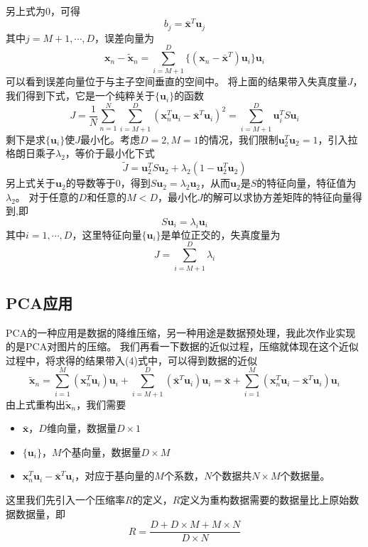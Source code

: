 \documentclass[UTF8,12pt]{ctexart}
\begin{document}
另上式为0，可得
\begin{equation}
	b_j=\bar{\bm{x}}^T\bm{u}_j
\end{equation}
其中$j=M+1,\cdots,D$，误差向量为
\begin{equation}
	\bm{x}_n-\tilde{\bm{x}}_n = \sum_{i=M+1}^D\{(\bm{x}_n-\bar{\bm{x}}^T)\bm{u}_i\}\bm{u}_i
\end{equation}
可以看到误差向量位于与主子空间垂直的空间中。
将上面的结果带入失真度量$J$，我们得到下式，它是一个纯粹关于$\{\bm{u}_i\}$的函数
\begin{equation}
	J=\frac{1}{N}\sum_{n=1}^N\sum_{i=M+1}^D(\bm{x}_n^T\bm{u}_i-\bar{\bm{x}}^T\bm{u}_i)^2
	=\sum_{i=M+1}^D\bm{u}_i^TS\bm{u}_i
\end{equation}
剩下是求$\{\bm{u}_i\}$使$J$最小化。考虑$D=2,M=1$的情况，我们限制$\bm{u}_2^T\bm{u}_2=1$，引入拉格朗日乘子$\lambda_2$，等价于最小化下式
\begin{equation}
	\tilde{J}=\bm{u}_2^TS\bm{u}_2+\lambda_2(1-\bm{u}_2^T\bm{u}_2)
\end{equation}
另上式关于$\bm{u}_2$的导数等于0，得到$S\bm{u}_2=\lambda_2\bm{u}_2$，从而$\bm{u}_2$是$S$的特征向量，特征值为$\lambda_2$。
对于任意的$D$和任意的$M<D$，最小化$J$的解可以求协方差矩阵的特征向量得到,即
\begin{equation}
	S\bm{u}_i=\lambda_i\bm{u}_i
\end{equation}
其中$i=1,\cdots,D$，这里特征向量$\{\bm{u}_i\}$是单位正交的，失真度量为
\begin{equation}
	J = \sum_{i=M+1}^D\lambda_i
\end{equation}
\subsection*{PCA应用}
PCA的一种应用是数据的降维压缩，另一种用途是数据预处理，我此次作业实现的是PCA对图片的压缩。
我们再看一下数据的近似过程，压缩就体现在这个近似过程中，将求得的结果带入(4)式中，可以得到数据的近似
\begin{equation}
\tilde{\bm{x}}_n = \sum_{i=1}^M(\bm{x}_n^T \bm{u}_i)\bm{u}_i+\sum_{i=M+1}^D(\bar{\bm{x}}^T\bm{u}_i)\bm{u}_i
	=\bar{\bm{x}}+\sum_{i=1}^M(\bm{x}_n^T\bm{u}_i-\bar{\bm{x}}^T\bm{u}_i)\bm{u}_i
\end{equation}
由上式重构出$\tilde{\bm{x}}_n$，我们需要
\begin{itemize}
	\item $\bar{\bm{x}}$，$D$维向量，数据量$D\times 1$
	\item $\{\bm{u}_i\}$，$M$个基向量，数据量$D \times M$
	\item $\bm{x}_n^T\bm{u}_i-\bar{\bm{x}}^T\bm{u}_i$，对应于基向量的$M$个系数，$N$个数据共$N \times M$个数据量。
\end{itemize}
这里我们先引入一个压缩率$R$的定义，$R$定义为重构数据需要的数据量比上原始数据数据量，即
\begin{equation}
	R=\frac{D+D\times M+M\times N}{D\times N}
\end{equation}
\end{document}
